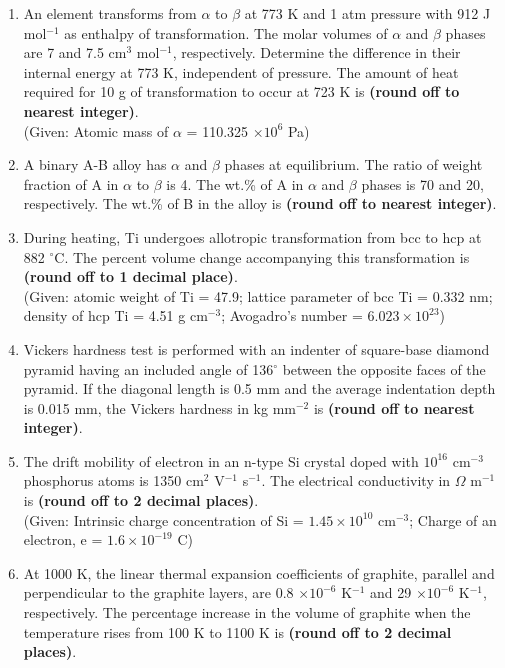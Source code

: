\documentclass[journal]{IEEEtran}
\numberwithin{equation}{enumi}
\numberwithin{figure}{enumi}
\begin{document}
\begin{enumerate}[start=53]
    \item An element transforms from $\alpha$ to $\beta$ at 773 K and 1 atm pressure with 912 J mol$^{-1}$ as enthalpy of transformation. The molar volumes of $\alpha$ and $\beta$ phases are 7 and 7.5 cm$^3$ mol$^{-1}$, respectively. Determine the difference in their internal energy at 773 K, independent of pressure. The amount of heat required for 10 g of transformation to occur at 723 K is \textbf{(round off to nearest integer)}. \\
    (Given: Atomic mass of $\alpha$ = 110.325 $\times 10^6$ Pa)

    \item A binary A-B alloy has $\alpha$ and $\beta$ phases at equilibrium. The ratio of weight fraction of A in $\alpha$ to $\beta$ is 4. The wt.\% of A in $\alpha$ and $\beta$ phases is 70 and 20, respectively. The wt.\% of B in the alloy is \textbf{(round off to nearest integer)}.

    \item During heating, Ti undergoes allotropic transformation from bcc to hcp at 882 $^{\circ}$C. The percent volume change accompanying this transformation is \textbf{(round off to 1 decimal place)}. \\
    (Given: atomic weight of Ti = 47.9; lattice parameter of bcc Ti = 0.332 nm; density of hcp Ti = 4.51 g cm$^{-3}$; Avogadro's number = $6.023 \times 10^{23}$)

    \item Vickers hardness test is performed with an indenter of square-base diamond pyramid having an included angle of 136$^{\circ}$ between the opposite faces of the pyramid. If the diagonal length is 0.5 mm and the average indentation depth is 0.015 mm, the Vickers hardness in kg mm$^{-2}$ is \textbf{(round off to nearest integer)}.

    \item The drift mobility of electron in an n-type Si crystal doped with $10^{16}$ cm$^{-3}$ phosphorus atoms is 1350 cm$^2$ V$^{-1}$ s$^{-1}$. The electrical conductivity in $\Omega$ m$^{-1}$ is \textbf{(round off to 2 decimal places)}. \\
    (Given: Intrinsic charge concentration of Si = $1.45 \times 10^{10}$ cm$^{-3}$; Charge of an electron, e = $1.6 \times 10^{-19}$ C)

    \item At 1000 K, the linear thermal expansion coefficients of graphite, parallel and perpendicular to the graphite layers, are 0.8 $\times 10^{-6}$ K$^{-1}$ and 29 $\times 10^{-6}$ K$^{-1}$, respectively. The percentage increase in the volume of graphite when the temperature rises from 100 K to 1100 K is \textbf{(round off to 2 decimal places)}.


\end{enumerate}
\end{document}
